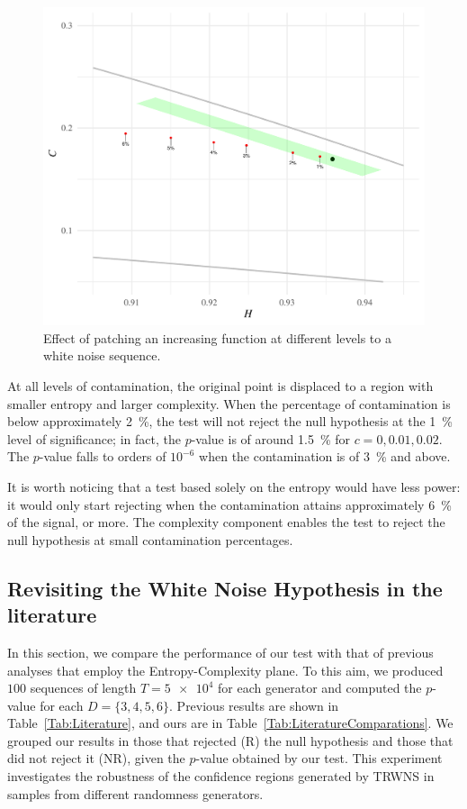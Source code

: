 \documentclass[alpha-refs]{wiley-article}
\begin{document}
\begin{figure}[hbt]
\centering
\includegraphics[width=.7\linewidth]{Figures/PointsPatchedIncreasingFunction}
\caption{Effect of patching an increasing function at different levels to a white noise sequence.}\label{Fig:PointsPatchedIncreasingFunction}
\end{figure}

At all levels of contamination, the original point is displaced to a region with smaller entropy and larger complexity.
When the percentage of contamination is below approximately \SI{2}{\percent}, the test will not reject the null hypothesis at the \SI{1}{\percent} level of significance; in fact, the $p$-value is of around \SI{1.5}{\percent} for $c=0,0.01,0.02$.
The $p$-value falls to orders of $10^{-6}$ when the contamination is of \SI{3}{\percent} and above.

It is worth noticing that a test based solely on the entropy would have less power: it would only start rejecting when the contamination attains approximately \SI{6}{\percent} of the signal, or more.
The complexity component enables the test to reject the null hypothesis at small contamination percentages.

\subsection{Revisiting the White Noise Hypothesis in the literature}

In this section, we compare the performance of our test with that of 
previous analyses that employ the Entropy-Complexity plane.
To this aim, we produced $100$ sequences of length $T = \num[scientific-notation=true]{5 e4}$ for each generator and computed the $p$-value for each $D = \{3, 4, 5, 6\}$.
Previous results are shown in Table~\ref{Tab:Literature}, and ours are in Table~\ref{Tab:LiteratureComparations}.
We grouped our results in those that rejected (R) the null hypothesis and those that did not reject it (NR), given the $p$-value obtained by our test. 
This experiment investigates the robustness of the confidence regions generated by TRWNS in samples from different randomness generators.
\end{document}
